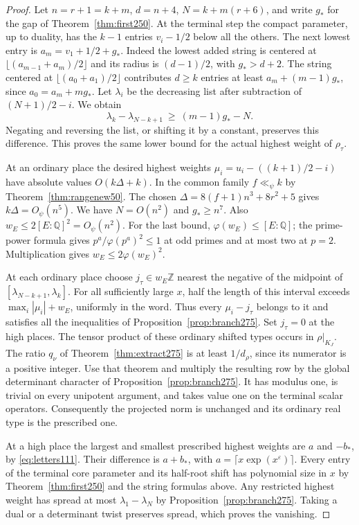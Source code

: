 \documentclass[a4paper,11pt]{article}
\theoremstyle{definition}
\theoremstyle{remark}
\numberwithin{equation}{section}
\begin{document}
\begin{proof}
Let \(n=r+1=k+m\), \(d=n+4\), \(N=k+m(r+6)\), and write \(g_*\)
for the gap of Theorem~\ref{thm:first250}. At the terminal step
the compact parameter, up to duality, has the \(k-1\) entries
\(v_i-1/2\) below all the others. The next lowest entry is
\(a_m=v_1+1/2+g_*\). Indeed the lowest added string is centered
at \(\lfloor(a_{m-1}+a_m)/2\rfloor\) and its radius is
\((d-1)/2\), with \(g_*>d+2\). The string centered at
\(\lfloor(a_0+a_1)/2\rfloor\) contributes \(d\ge k\) entries
at least \(a_m+(m-1)g_*\), since \(a_0=a_m+mg_*\).
Let \(\lambda_i\) be the decreasing list after subtraction of
\((N+1)/2-i\). We obtain
\[
       \lambda_k-\lambda_{N-k+1}\ \ge\ (m-1)g_*-N .
\]
Negating and reversing the list, or shifting it by a constant,
preserves this difference. This proves the same lower bound
for the actual highest weight of \(\rho_\tau\).

At an ordinary place the desired highest weights
\(\mu_i=u_i-((k+1)/2-i)\) have absolute values
\(O(k\Delta+k)\). In the common family \(f\ll_\psi k\) by
Theorem~\ref{thm:rangenew50}. The chosen
\(\Delta=8(f+1)n^3+8r^2+5\) gives \(k\Delta=O_\psi(n^5)\).
We have \(N=O(n^2)\) and \(g_*\ge n^7\).
Also \(w_E\le 2[E:\mathbb Q]^2=O_\psi(n^2)\).
For the last bound, \(\varphi(w_E)\le [E:\mathbb Q]\);
the prime-power formula gives \(p^a/\varphi(p^a)^2\le1\)
at odd primes and at most two at \(p=2\). Multiplication gives
\(w_E\le2\varphi(w_E)^2\).

At each ordinary place choose \(j_\tau\in w_E\mathbb Z\)
nearest the negative of the midpoint of
\([\lambda_{N-k+1},\lambda_k]\). For all sufficiently large
\(x\), half the length of this interval exceeds
\(\max_i|\mu_i|+w_E\), uniformly in the word. Thus every
\(\mu_i-j_\tau\) belongs to it and satisfies all the
inequalities of Proposition~\ref{prop:branch275}.
Set \(j_\tau=0\) at the high places. The tensor product of
these ordinary shifted types occurs in \(\rho|_{K_J}\).
The ratio \(q_\nu\) of Theorem~\ref{thm:extract275} is at
least \(1/d_\rho\), since its numerator is a positive integer.
Use that theorem and multiply the resulting row by the
global determinant character of Proposition~\ref{prop:branch275}.
It has modulus one, is trivial on every unipotent argument,
and takes value one on the terminal scalar operators.
Consequently the projected norm is unchanged and its ordinary
real type is the prescribed one.

At a high place the largest and smallest prescribed highest
weights are \(a\) and \(-b_*\), by \eqref{eq:letters111}.
Their difference is \(a+b_*\), with \(a=\lceil x\exp(x^\varepsilon)\rceil\).
Every entry of the terminal core parameter and its half-root
shift has polynomial size in \(x\) by Theorem~\ref{thm:first250}
and the string formulas above. Any restricted highest weight
has spread at most \(\lambda_1-\lambda_N\) by
Proposition~\ref{prop:branch275}. Taking a dual or a
determinant twist preserves spread, which proves the vanishing.
\end{proof}
\end{document}
